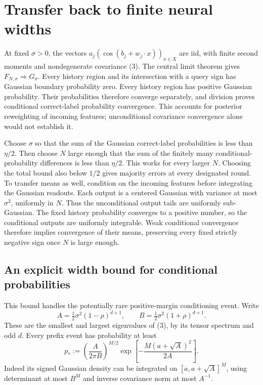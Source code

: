 \documentclass[11pt]{article}
\begin{document}
\section{Transfer back to finite neural widths}
At fixed $\sigma>0$, the vectors
$a_j(\cos(b_j+w_j\cdot x))_{x\in X}$ are iid, with finite second
moments and nondegenerate covariance (3).
The central limit theorem gives $F_{N,\sigma}\Rightarrow G_\sigma$.
Every history region and its intersection with a query sign has Gaussian
boundary probability zero. Every history region has positive Gaussian
probability. Their probabilities therefore converge separately, and
division proves conditional correct-label probability convergence.
This accounts for posterior reweighting of incoming features;
unconditional covariance convergence alone would not establish it.

Choose $\sigma$ so that the sum of the Gaussian correct-label
probabilities is less than $\eta/2$. Then choose $N$ large enough that
the sum of the finitely many conditional-probability differences is
less than $\eta/2$. This works for every larger $N$.
Choosing the total bound also below $1/2$ gives majority errors at every
designated round. To transfer means as well, condition on the incoming
features before integrating the Gaussian readouts. Each output is a
centered Gaussian with variance at most $\sigma^2$, uniformly in $N$.
Thus the unconditional output tails are uniformly sub-Gaussian.
The fixed history probability converges to a positive number, so the
conditional outputs are uniformly integrable. Weak conditional convergence
therefore implies convergence of their means, preserving every fixed
strictly negative sign once $N$ is large enough.

\subsection{An explicit width bound for conditional probabilities}
This bound handles the potentially rare positive-margin conditioning
event. Write
\[
 A=\tfrac12\sigma^2(1-\rho)^{d+1},\qquad
 B=\tfrac12\sigma^2(1+\rho)^{d+1}.
\]
These are the smallest and largest eigenvalues of (3), by its tensor
spectrum and odd $d$. Every prefix event has probability at least
\[
 p_*:=\left(\frac A{2\pi B}\right)^{M/2}
               \exp\left[-\frac{M(a+\sqrt A)^2}{2A}\right].     \tag{12}
\]
Indeed its signed Gaussian density can be integrated on
$[a,a+\sqrt A]^M$, using determinant at most $B^M$ and inverse
covariance norm at most $A^{-1}$.
\end{document}
